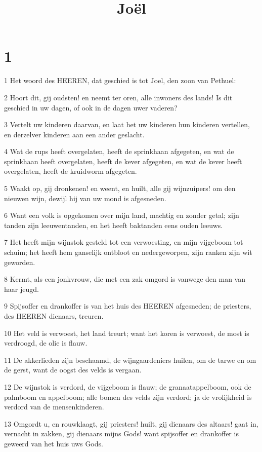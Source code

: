 

\title{Joël}



\chapter{1}

\par 1 Het woord des HEEREN, dat geschied is tot Joel, den zoon van Pethuel:
\par 2 Hoort dit, gij oudsten! en neemt ter oren, alle inwoners des lands! Is dit geschied in uw dagen, of ook in de dagen uwer vaderen?
\par 3 Vertelt uw kinderen daarvan, en laat het uw kinderen hun kinderen vertellen, en derzelver kinderen aan een ander geslacht.
\par 4 Wat de rups heeft overgelaten, heeft de sprinkhaan afgegeten, en wat de sprinkhaan heeft overgelaten, heeft de kever afgegeten, en wat de kever heeft overgelaten, heeft de kruidworm afgegeten.
\par 5 Waakt op, gij dronkenen! en weent, en huilt, alle gij wijnzuipers! om den nieuwen wijn, dewijl hij van uw mond is afgesneden.
\par 6 Want een volk is opgekomen over mijn land, machtig en zonder getal; zijn tanden zijn leeuwentanden, en het heeft baktanden eens ouden leeuws.
\par 7 Het heeft mijn wijnstok gesteld tot een verwoesting, en mijn vijgeboom tot schuim; het heeft hem ganselijk ontbloot en nedergeworpen, zijn ranken zijn wit geworden.
\par 8 Kermt, als een jonkvrouw, die met een zak omgord is vanwege den man van haar jeugd.
\par 9 Spijsoffer en drankoffer is van het huis des HEEREN afgesneden; de priesters, des HEEREN dienaars, treuren.
\par 10 Het veld is verwoest, het land treurt; want het koren is verwoest, de most is verdroogd, de olie is flauw.
\par 11 De akkerlieden zijn beschaamd, de wijngaardeniers huilen, om de tarwe en om de gerst, want de oogst des velds is vergaan.
\par 12 De wijnstok is verdord, de vijgeboom is flauw; de granaatappelboom, ook de palmboom en appelboom; alle bomen des velds zijn verdord; ja de vrolijkheid is verdord van de mensenkinderen.
\par 13 Omgordt u, en rouwklaagt, gij priesters! huilt, gij dienaars des altaars! gaat in, vernacht in zakken, gij dienaars mijns Gods! want spijsoffer en drankoffer is geweerd van het huis uws Gods.
